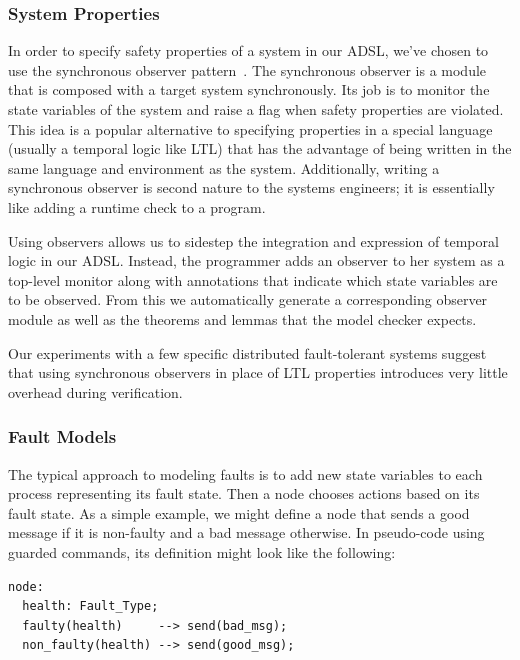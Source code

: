 
\subsubsection{System Properties}
\label{ssec:lima-properties}

In order to specify safety properties of a system in our ADSL, we've chosen to
use the synchronous observer pattern~\cite{Rushby-2012}. The synchronous
observer is a module that is composed with a target system synchronously. Its
job is to monitor the state variables of the system and raise a flag when
safety properties are violated. This idea is a popular alternative to
specifying properties in a special language (usually a temporal logic like
LTL) that has the advantage of being written in the same language and
environment as the system. Additionally, writing a synchronous observer is
second nature to the systems engineers; it is essentially like adding a runtime
check to a program.

Using observers allows us to sidestep the integration and expression of
temporal logic in our ADSL. Instead, the programmer adds an observer to her
system as a top-level monitor along with annotations that indicate which state
variables are to be observed.  From this we automatically generate a
corresponding observer module as well as the theorems and lemmas that the
model checker expects.

Our experiments with a few specific distributed fault-tolerant systems suggest
that using synchronous observers in place of LTL properties introduces very
little overhead during verification.



\subsubsection{Fault Models}\label{ssec:fault-models}

The typical approach to modeling faults is to add new state variables to each process representing its fault state. Then a node chooses actions based on its fault state. As a simple example, we might define a node that sends a good message if it is non-faulty and a bad message otherwise. In pseudo-code using guarded commands, its definition might look like the following:

\small
\begin{verbatim}
node:
  health: Fault_Type;
  faulty(health)     --> send(bad_msg);
  non_faulty(health) --> send(good_msg);
\end{verbatim}
\normalsize

